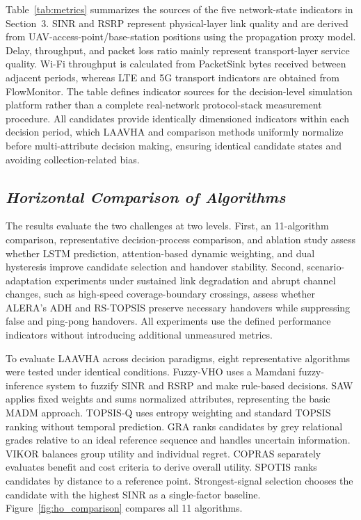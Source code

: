 \documentclass[10pt,a4paper]{article}
\begin{document}
Table~\ref{tab:metrics} summarizes the sources of the five network-state indicators in Section~3. SINR and RSRP represent physical-layer link quality and are derived from UAV-access-point/base-station positions using the propagation proxy model. Delay, throughput, and packet loss ratio mainly represent transport-layer service quality. Wi-Fi throughput is calculated from PacketSink bytes received between adjacent periods, whereas LTE and 5G transport indicators are obtained from FlowMonitor. The table defines indicator sources for the decision-level simulation platform rather than a complete real-network protocol-stack measurement procedure. All candidates provide identically dimensioned indicators within each decision period, which LAAVHA and comparison methods uniformly normalize before multi-attribute decision making, ensuring identical candidate states and avoiding collection-related bias.

\subsection{\textmd{\textit{Horizontal Comparison of Algorithms}}}

The results evaluate the two challenges at two levels. First, an 11-algorithm comparison, representative decision-process comparison, and ablation study assess whether LSTM prediction, attention-based dynamic weighting, and dual hysteresis improve candidate selection and handover stability. Second, scenario-adaptation experiments under sustained link degradation and abrupt channel changes, such as high-speed coverage-boundary crossings, assess whether ALERA's ADH and RS-TOPSIS preserve necessary handovers while suppressing false and ping-pong handovers. All experiments use the defined performance indicators without introducing additional unmeasured metrics.

To evaluate LAAVHA across decision paradigms, eight representative algorithms were tested under identical conditions. Fuzzy-VHO uses a Mamdani fuzzy-inference system to fuzzify SINR and RSRP and make rule-based decisions. SAW applies fixed weights and sums normalized attributes, representing the basic MADM approach. TOPSIS-Q uses entropy weighting and standard TOPSIS ranking without temporal prediction. GRA ranks candidates by grey relational grades relative to an ideal reference sequence and handles uncertain information. VIKOR balances group utility and individual regret. COPRAS separately evaluates benefit and cost criteria to derive overall utility. SPOTIS ranks candidates by distance to a reference point. Strongest-signal selection chooses the candidate with the highest SINR as a single-factor baseline. Figure~\ref{fig:ho_comparison} compares all 11 algorithms.
\end{document}
